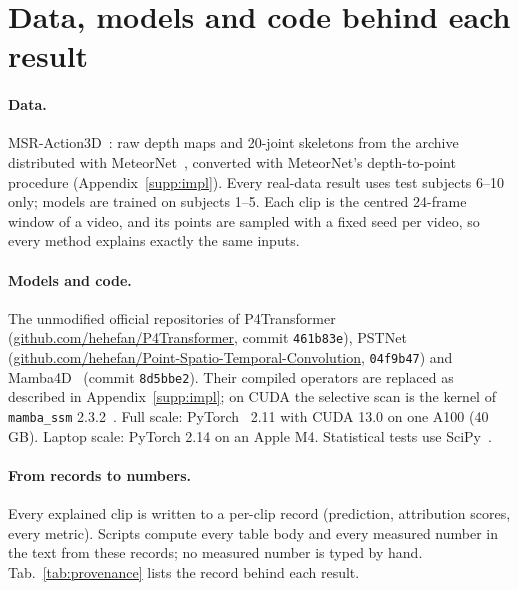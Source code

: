 \begin{table}[h]
\centering\small\tablecitesoff

\caption{Controlled ablation (1 seed): the $(0,0)$ corner and the order. Motion share within the odd cluster on the motion (mot.) and shape (shape) models; the decomposition is correct iff mot.\ $\approx1$ and shape $\approx0$.}
\label{tab:controlled-abl}
\end{table}

\section{Data, models and code behind each result}
\label{supp:provenance}
\paragraph{Data.} MSR-Action3D~\cite{li2010msraction3d}: raw depth maps and 20-joint skeletons from the archive distributed with MeteorNet~\cite{liu2019meteornet}, converted with MeteorNet's depth-to-point procedure (Appendix~\ref{supp:impl}). Every real-data result uses test subjects 6--10 only; models are trained on subjects 1--5. Each clip is the centred 24-frame window of a video, and its points are sampled with a fixed seed per video, so every method explains exactly the same inputs.

\paragraph{Models and code.} The unmodified official repositories of P4Transformer~\cite{fan2021p4transformer} (\url{github.com/hehefan/P4Transformer}, commit \texttt{461b83e}), PSTNet~\cite{fan2021pstnet} (\url{github.com/hehefan/Point-Spatio-Temporal-Convolution}, \texttt{04f9b47}) and Mamba4D~\cite{liu2025mamba4d} (commit \texttt{8d5bbe2}). Their compiled operators are replaced as described in Appendix~\ref{supp:impl}; on CUDA the selective scan is the kernel of \texttt{mamba\_ssm} 2.3.2~\cite{gu2024mamba}. Full scale: PyTorch~\cite{paszke2019pytorch} 2.11 with CUDA 13.0 on one A100 (40\,GB). Laptop scale: PyTorch 2.14 on an Apple M4. Statistical tests use SciPy~\cite{virtanen2020scipy}.

\paragraph{From records to numbers.} Every explained clip is written to a per-clip record (prediction, attribution scores, every metric). Scripts compute every table body and every measured number in the text from these records; no measured number is typed by hand. Tab.~\ref{tab:provenance} lists the record behind each result.

